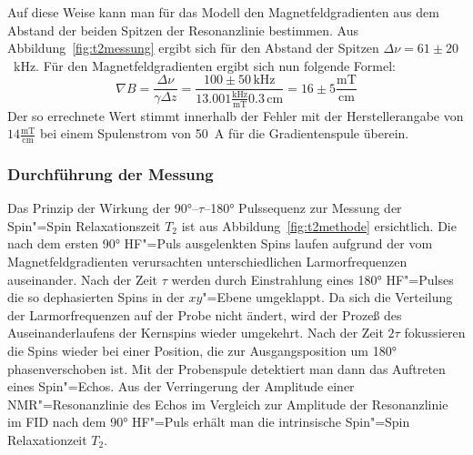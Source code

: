 Auf diese Weise kann man für das Modell den Magnetfeldgradienten aus dem Abstand der beiden
Spitzen der Resonanzlinie bestimmen. Aus Abbildung~\ref{fig:t2messung} ergibt sich für den Abstand
der Spitzen $\Delta\nu=61\pm20$~kHz. Für den Magnetfeldgradienten ergibt sich nun folgende Formel:
	\begin{equation}
		\nabla B=\frac{\Delta\nu}{\gamma\Delta z}=
			\frac{100\pm50\,\mathrm{kHz}}{13.001\frac{\mathrm{kHz}}{\mathrm{mT}}0.3\,\mathrm{cm}}=
			16\pm5\frac{\mathrm{mT}}{\mathrm{cm}}
	\end{equation}
Der so errechnete Wert stimmt innerhalb der Fehler mit der Herstellerangabe von
$14\frac{\mathrm{mT}}{\mathrm{cm}}$ bei einem Spulenstrom von 50~A für die Gradientenspule
überein.

\subsubsection{Durchführung der Messung}

Das Prinzip der Wirkung der 90°--$\tau$--180° Pulssequenz zur Messung der
Spin"=Spin Relaxationszeit $T_2$ ist aus Abbildung~\ref{fig:t2methode} ersichtlich. Die nach
dem ersten 90° HF"=Puls ausgelenkten Spins laufen aufgrund der vom Magnetfeldgradienten
verursachten unterschiedlichen Larmorfrequenzen auseinander. Nach der Zeit $\tau$ werden durch Einstrahlung
eines 180° HF"=Pulses die so dephasierten Spins in der $xy$"=Ebene umgeklappt. Da sich die Verteilung der
Larmorfrequenzen auf der Probe nicht ändert, wird der Prozeß des
Auseinanderlaufens der Kernspins wieder umgekehrt. Nach der Zeit $2\tau$ fokussieren die Spins
wieder bei einer Position, die zur Ausgangsposition um 180° phasenverschoben ist. Mit der
Probenspule detektiert man dann das Auftreten eines Spin"=Echos. Aus der Verringerung der Amplitude
einer NMR"=Resonanzlinie des Echos im Vergleich zur Amplitude der Resonanzlinie im FID nach dem 90°
HF"=Puls erhält man die intrinsische Spin"=Spin Relaxationzeit $T_2$.

